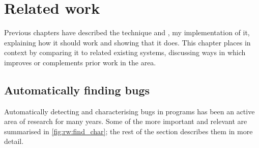 \chapter{Related work}
\label{chapter:related_work}

Previous chapters have described the {\technique} technique and
{\implementation}, my implementation of it, explaining how it should
work and showing that it does.  This chapter places {\technique} in
context by comparing it to related existing systems, discussing ways
in which {\technique} improves or complements prior work in the area.

\section{Automatically finding bugs}

Automatically detecting and characterising bugs in programs has been
an active area of research for many years.  Some of the more important
and relevant are summarised in \autoref{fig:rw:find_char}; the rest of
the section describes them in more detail.  


